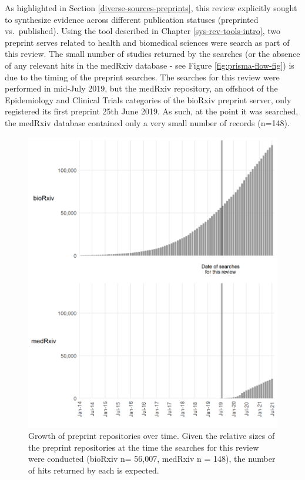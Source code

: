 \documentclass[a4paper, twoside]{templates/ociamthesis}
\begin{document}
As highlighted in Section \ref{diverse-sources-preprints}, this review explicitly sought to synthesize evidence across different publication statuses (preprinted vs.~published). Using the tool described in Chapter \ref{sys-rev-tools-intro}, two preprint serves related to health and biomedical sciences were search as part of this review. The small number of studies returned by the searches (or the absence of any relevant hits in the medRxiv database - see Figure \ref{fig:prisma-flow-fig}) is due to the timing of the preprint searches. The searches for this review were performed in mid-July 2019, but the medRxiv repository, an offshoot of the Epidemiology and Clinical Trials categories of the bioRxiv preprint server, only registered its first preprint 25th June 2019. As such, at the point it was searched, the medRxiv database contained only a very small number of records (n=148).





\begin{figure}[H]

{\centering \includegraphics[width=0.8\linewidth]{figures/sys-rev/preprint_growth} 

}

\caption[Growth of preprint repositories over time]{Growth of preprint repositories over time. Given the relative sizes of the preprint repositories at the time the searches for this review were conducted (bioRxiv n= 56,007, medRxiv n = 148), the number of hits returned by each is expected.}\label{fig:preprintGrowth}
\end{figure}
\end{document}
